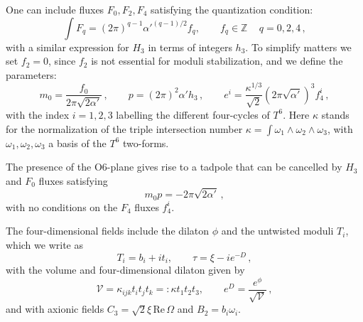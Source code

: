 \documentclass[12pt,a4wide]{article}
\def\V{\mathcal{V}}
\def\be{\begin{equation}}
\def\ee{\end{equation}}
\begin{document}
One can include fluxes $F_0, F_2, F_4$ satisfying the quantization condition:
\be
\int F_q=(2\pi)^{q-1}\alpha'^{(q-1)/2} f_q, \qquad f_q \in \mathbb Z\,\quad q=0,2,4\,,
\ee
with a similar expression for $H_3$ in terms of integers $h_3$. 
To simplify matters we set $f_2=0$, since $f_2$ is not essential for moduli stabilization, and we define the parameters:
\be
m_0=\frac{f_0}{2\pi \sqrt{2\alpha'}}\,, \qquad p= (2\pi)^2 \alpha' h_3\,, \qquad e^i=\frac{\kappa^{1/3}}{\sqrt{2}}\left(2\pi \sqrt{\alpha'} \right)^3 f_4^i\,,
\ee
with the index $i=1,2,3$  labelling the different four-cycles of $T^6$. Here $\kappa$ stands for the normalization of the triple intersection number  $\kappa=\int \omega_1\wedge \omega_2 \wedge \omega_3$, with $\omega_1,\omega_2,\omega_3$ a basis of the $T^6$ two-forms. 

The presence  of the O6-plane gives rise to a tadpole that can be cancelled by $H_3$ and $F_0$ fluxes satisfying
\be
m_0p = -2\pi \sqrt{2\alpha'}\,,
\ee
with no conditions on the $F_4$ fluxes $f_4^i$.

The four-dimensional fields include
the dilaton $\phi$ and the untwisted moduli $T_i$, which we write as
\be
T_i=b_i+ i t_i, \qquad \tau= \xi-i e^{-D}\,,
\ee
with  the volume and four-dimensional dilaton given by
\be
\V=\kappa_{ijk}t_it_jt_k=:\kappa t_1 t_2 t_3, \qquad e^D=\frac{e^\phi}{\sqrt{\V}}\,,
\ee
and with axionic fields $C_3=\sqrt{2}\xi\,\text{Re}\,\Omega$ and $B_2= b_i\omega_i$.
\end{document}
